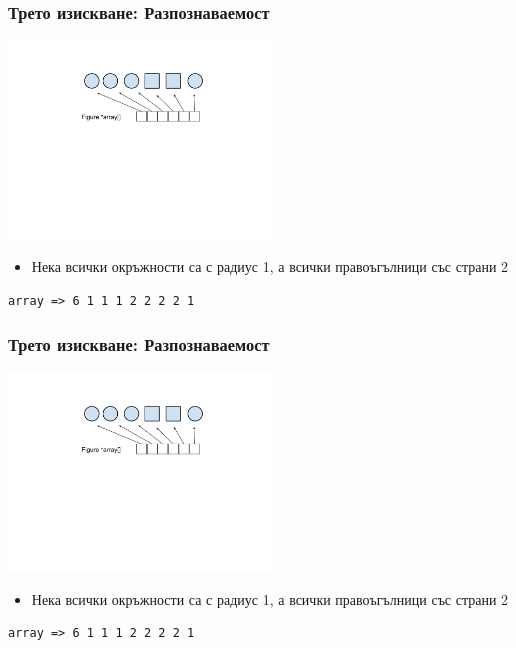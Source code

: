 \documentclass{beamer}
\begin{document}
\begin{frame}[fragile]
\frametitle{Трето изискване: Разпознаваемост}

\vspace{-60px}
\begin{center}
\includegraphics[width=7.0cm]{images/array}
\end{center}

\vspace{-80px}

\begin{itemize}
  \item Нека всички окръжности са с радиус 1, а всички правоъгълници със страни 2
\end{itemize}

\begin{lstlisting}
array => 6 1 1 1 2 2 2 2 1 
\end{lstlisting}  

\end{frame}

\begin{frame}[fragile]
\frametitle{Трето изискване: Разпознаваемост}

\vspace{-60px}
\begin{center}
\includegraphics[width=7.0cm]{images/array}
\end{center}

\vspace{-80px}

\begin{itemize}
  \item Нека всички окръжности са с радиус 1, а всички правоъгълници със страни 2
\end{itemize}

\begin{lstlisting}
array => 6 1 1 1 2 2 2 2 1 
\end{lstlisting}  

\end{frame}
\end{document}
